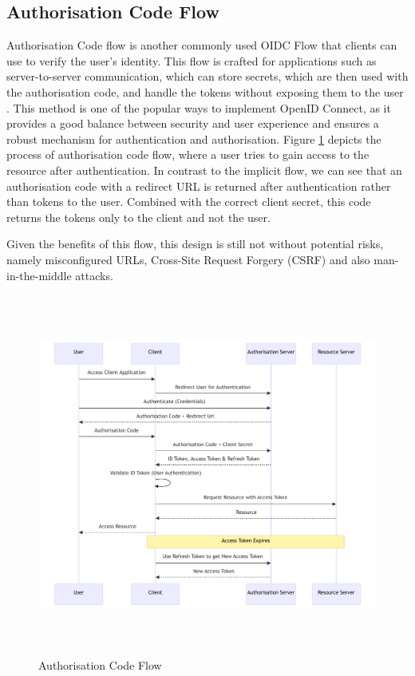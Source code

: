 \subsection{Authorisation Code Flow}
Authorisation Code flow is another commonly used OIDC Flow that clients can use to verify the user's identity.
This flow is crafted for applications such as server-to-server communication, which can store secrets, which are then used with the authorisation code, and handle the tokens without exposing them to the user \citep{auth_flow_oidc}.
This method is one of the popular ways to implement OpenID Connect, as it provides a good balance between security and user experience and ensures a robust mechanism for authentication and authorisation.
Figure \ref{fig:authorisation_flow} depicts the process of authorisation code flow, where a user tries to gain access to the resource after authentication.
In contrast to the implicit flow, we can see that an authorisation code with a redirect URL is returned after authentication rather than tokens to the user.
Combined with the correct client secret, this code returns the tokens only to the client and not the user. 

Given the benefits of this flow, this design is still not without potential risks, namely misconfigured URLs, Cross-Site Request Forgery (CSRF) and also man-in-the-middle attacks. 

\begin{figure}[h!]
\centering
\label{fig:authorisation_flow}
\includegraphics[width=\textwidth, height=450px]{pics/authorization_code.pdf}
\caption{Authorisation Code Flow}
\end{figure}

